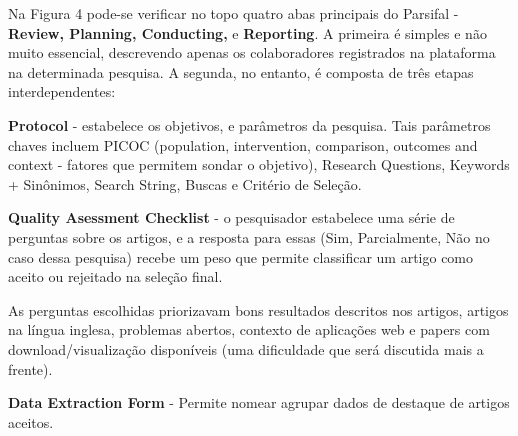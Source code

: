 \bigskip

Na Figura 4 pode-se verificar no topo quatro abas principais do Parsifal - \textbf{Review, Planning, Conducting, }e \textbf{Reporting}. A primeira é simples e não muito essencial, descrevendo apenas os colaboradores registrados na plataforma na determinada pesquisa. A segunda, no entanto, é composta de três etapas interdependentes:

\begin{alineas}

\item \textbf{Protocol} - estabelece os objetivos, e parâmetros da pesquisa. Tais parâmetros chaves incluem PICOC (population, intervention, comparison, outcomes and context - fatores que permitem sondar o objetivo), Research Questions, Keywords + Sinônimos, Search String, Buscas e Critério de Seleção.

\item \textbf{Quality Asessment Checklist} - o pesquisador estabelece uma série de perguntas sobre os artigos, e a resposta para essas (Sim, Parcialmente, Não no caso dessa pesquisa) recebe um peso que permite classificar um artigo como aceito ou rejeitado na seleção final. 

As perguntas escolhidas priorizavam bons resultados descritos nos artigos, artigos na língua inglesa, problemas abertos, contexto de aplicações web e papers com download/visualização disponíveis (uma dificuldade que será discutida mais a frente).

\item \textbf{Data Extraction Form} - Permite nomear agrupar dados de destaque de artigos aceitos.

\end{alineas}


